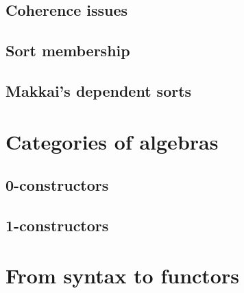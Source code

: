 \subsection{Coherence issues}

\subsection{Sort membership}


\subsection{Makkai's dependent sorts}

\section{Categories of algebras}

\subsection{0-constructors}

\subsection{1-constructors}


\section{From syntax to functors}


